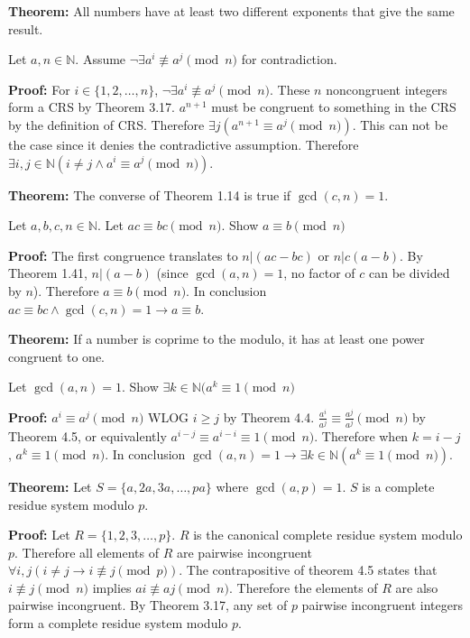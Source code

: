 \item \textbf{Theorem:} All numbers have at least two different exponents that give the same result.

Let \(a, n \in \mathbb N\). Assume \(\neg \exists a^i \not\equiv a^j \pmod n\) for contradiction.

\textbf{Proof:} For \(i \in \{1, 2, \dots, n\}\), \(\neg \exists a^i \not\equiv a^j \pmod n\). These \(n\) noncongruent integers form a CRS by Theorem 3.17. \(a^{n+1}\) must be congruent to something in the CRS by the definition of CRS. Therefore \(\exists j (a^{n+1} \equiv a^j \pmod n)\). This can not be the case since it denies the contradictive assumption. Therefore \(\exists i, j \in \mathbb N (i \neq j \wedge a^i \equiv a^j \pmod n)\). \qedhere

\item \textbf{Theorem:} The converse of Theorem 1.14 is true if \(\gcd(c, n) = 1\).

Let \(a, b, c, n \in \mathbb N\). Let \(ac \equiv bc \pmod n\). Show \(a \equiv b \pmod n\)

\textbf{Proof:} The first congruence translates to \(n | (ac-bc)\) or \(n | c(a-b)\). By Theorem 1.41, \(n | (a-b)\) (since \(\gcd(a, n) = 1\), no factor of \(c\) can be divided by \(n\)). Therefore \(a \equiv b \pmod n\). In conclusion \(ac \equiv bc \wedge \gcd(c, n) = 1 \rightarrow a \equiv b\). \qedhere

\item \textbf{Theorem:} If a number is coprime to the modulo, it has at least one power congruent to one.

Let \(\gcd(a, n) = 1\). Show \(\exists k \in \mathbb N (a^k \equiv 1 \pmod n\)

\textbf{Proof:} \(a^i \equiv a^j \pmod n\) WLOG \(i \geq j\) by Theorem 4.4. \(\frac{a^i}{a^j} \equiv \frac{a^j}{a^j} \pmod n\) by Theorem 4.5, or equivalently \(a^{i-j} \equiv a^{i-i} \equiv 1 \pmod n\). Therefore when \(k = i - j\), \(a^k \equiv 1 \pmod n\). In conclusion \(\gcd(a, n) = 1 \rightarrow \exists k \in \mathbb N (a^k \equiv 1 \pmod n)\). \qedhere

\setcounter{enumii}{12}
\item \textbf{Theorem:} Let \(S = \{a, 2a, 3a, \dots, pa\}\) where \(\gcd(a, p) = 1\). \(S\) is a complete residue system modulo \(p\).

\textbf{Proof:} Let \(R = \{1, 2, 3, \dots, p\}\). \(R\) is the canonical complete residue system modulo \(p\). Therefore all elements of \(R\) are pairwise incongruent \(\forall i, j (i \neq j \rightarrow i \not\equiv j \pmod p)\). The contrapositive of theorem 4.5 states that \(i \not\equiv j \pmod n\) implies \(ai \not\equiv aj \pmod n\). Therefore the elements of \(R\) are also pairwise incongruent. By Theorem 3.17, any set of \(p\) pairwise incongruent integers form a complete residue system modulo \(p\).

